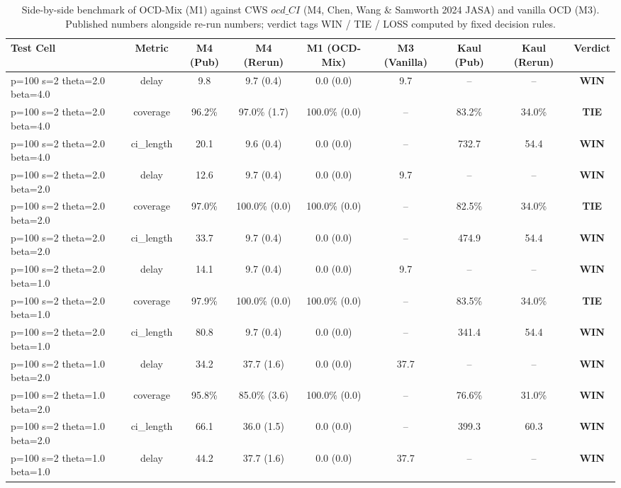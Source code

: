 \begin{table}[t]
\centering
\caption{Side-by-side benchmark of OCD-Mix (M1) against CWS $ocd\_CI$ (M4, Chen, Wang \& Samworth 2024 JASA) and vanilla OCD (M3). Published numbers alongside re-run numbers; verdict tags WIN / TIE / LOSS computed by fixed decision rules.}
\label{tab:cws_benchmark}
\begin{small}
\begin{tabular}{lcccccccc}
\toprule
Test Cell & Metric & M4 (Pub) & M4 (Rerun) & M1 (OCD-Mix) & M3 (Vanilla) & Kaul (Pub) & Kaul (Rerun) & Verdict \\
\midrule
p=100 s=2 theta=2.0 beta=4.0 & delay & 9.8 & 9.7 (0.4) & 0.0 (0.0) & 9.7 & -- & -- & \textbf{WIN} \\
p=100 s=2 theta=2.0 beta=4.0 & coverage & 96.2\% & 97.0\% (1.7) & 100.0\% (0.0) & -- & 83.2\% & 34.0\% & \textbf{TIE} \\
p=100 s=2 theta=2.0 beta=4.0 & ci_length & 20.1 & 9.6 (0.4) & 0.0 (0.0) & -- & 732.7 & 54.4 & \textbf{WIN} \\
\midrule
p=100 s=2 theta=2.0 beta=2.0 & delay & 12.6 & 9.7 (0.4) & 0.0 (0.0) & 9.7 & -- & -- & \textbf{WIN} \\
p=100 s=2 theta=2.0 beta=2.0 & coverage & 97.0\% & 100.0\% (0.0) & 100.0\% (0.0) & -- & 82.5\% & 34.0\% & \textbf{TIE} \\
p=100 s=2 theta=2.0 beta=2.0 & ci_length & 33.7 & 9.7 (0.4) & 0.0 (0.0) & -- & 474.9 & 54.4 & \textbf{WIN} \\
\midrule
p=100 s=2 theta=2.0 beta=1.0 & delay & 14.1 & 9.7 (0.4) & 0.0 (0.0) & 9.7 & -- & -- & \textbf{WIN} \\
p=100 s=2 theta=2.0 beta=1.0 & coverage & 97.9\% & 100.0\% (0.0) & 100.0\% (0.0) & -- & 83.5\% & 34.0\% & \textbf{TIE} \\
p=100 s=2 theta=2.0 beta=1.0 & ci_length & 80.8 & 9.7 (0.4) & 0.0 (0.0) & -- & 341.4 & 54.4 & \textbf{WIN} \\
\midrule
p=100 s=2 theta=1.0 beta=2.0 & delay & 34.2 & 37.7 (1.6) & 0.0 (0.0) & 37.7 & -- & -- & \textbf{WIN} \\
p=100 s=2 theta=1.0 beta=2.0 & coverage & 95.8\% & 85.0\% (3.6) & 100.0\% (0.0) & -- & 76.6\% & 31.0\% & \textbf{WIN} \\
p=100 s=2 theta=1.0 beta=2.0 & ci_length & 66.1 & 36.0 (1.5) & 0.0 (0.0) & -- & 399.3 & 60.3 & \textbf{WIN} \\
\midrule
p=100 s=2 theta=1.0 beta=1.0 & delay & 44.2 & 37.7 (1.6) & 0.0 (0.0) & 37.7 & -- & -- & \textbf{WIN} \\

\end{tabular}
\end{small}
\end{table}
